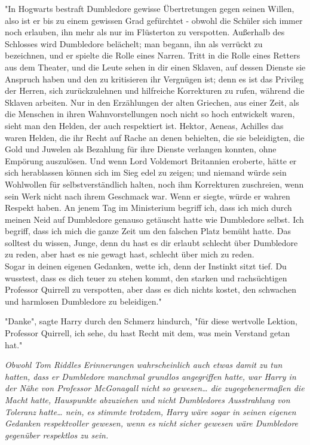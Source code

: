 {"In Hogwarts bestraft Dumbledore gewisse Übertretungen gegen seinen Willen, also ist er bis zu einem gewissen Grad gefürchtet - obwohl die Schüler sich immer noch erlauben, ihn mehr als nur im Flüsterton zu verspotten. Außerhalb des Schlosses wird Dumbledore belächelt; man begann, ihn als verrückt zu bezeichnen, und er spielte die Rolle eines Narren. Tritt in die Rolle eines Retters aus dem Theater, und die Leute sehen in dir einen Sklaven, auf dessen Dienste sie Anspruch haben und den zu kritisieren ihr Vergnügen ist; denn es ist das Privileg der Herren, sich zurückzulehnen und hilfreiche Korrekturen zu rufen, während die Sklaven arbeiten. Nur in den Erzählungen der alten Griechen, aus einer Zeit, als die Menschen in ihren Wahnvorstellungen noch nicht so hoch entwickelt waren, sieht man den Helden, der auch respektiert ist. Hektor, Aeneas, Achilles das waren Helden, die ihr Recht auf Rache an denen behielten, die sie beleidigten, die Gold und Juwelen als Bezahlung für ihre Dienste verlangen konnten, ohne Empörung auszulösen. Und wenn Lord Voldemort Britannien eroberte, hätte er sich herablassen können sich im Sieg edel zu zeigen; und niemand würde sein Wohlwollen für selbstverständlich halten, noch ihm Korrekturen zuschreien, wenn sein Werk nicht nach ihrem Geschmack war. Wenn er siegte, würde er wahren Respekt haben. An jenem Tag im Ministerium begriff ich, dass ich mich durch meinen Neid auf Dumbledore genauso getäuscht hatte wie Dumbledore selbst. Ich begriff, dass ich mich die ganze Zeit um den falschen Platz bemüht hatte. Das solltest du wissen, Junge, denn du hast es dir erlaubt schlecht über Dumbledore zu reden, aber hast es nie gewagt hast, schlecht über mich zu reden.\\ Sogar in deinen eigenen Gedanken, wette ich, denn der Instinkt sitzt tief. Du wusstest, dass es dich teuer zu stehen kommt, den starken und rachsüchtigen Professor Quirrell zu verspotten, aber dass es dich nichts kostet, den schwachen und harmlosen Dumbledore zu beleidigen."

"Danke", sagte Harry durch den Schmerz hindurch, "für diese wertvolle Lektion, Professor Quirrell, ich sehe, du hast Recht mit dem, was mein Verstand getan hat."

\emph{Obwohl Tom Riddles Erinnerungen wahrscheinlich auch etwas damit zu tun hatten, dass er Dumbledore manchmal grundlos angegriffen hatte, war Harry in der Nähe von Professor McGonagall nicht so gewesen… die zugegebenermaßen die Macht hatte, Hauspunkte abzuziehen und nicht Dumbledores Ausstrahlung von Toleranz hatte… nein, es stimmte trotzdem, Harry wäre sogar in seinen eigenen Gedanken respektvoller gewesen, wenn es nicht sicher gewesen wäre Dumbledore gegenüber respektlos zu sein.}

}
